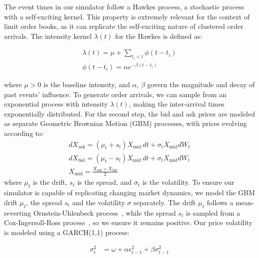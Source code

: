 \documentclass[11pt]{article}
\begin{document}
    The event times in our simulator follow a Hawkes process,
    a stochastic process with a self-exciting kernel.
    This property is extremely relevant for the context of limit order books,
    as it can replicate the self-exciting nature of clustered order arrivals.
    The intensity kernel \( \lambda(t) \) for the Hawkes is defined as:

    \begin{equation}
        \begin{aligned}
            \lambda(t) = \mu + \sum_{t_i < t} \phi(t - t_i)\\
            \phi(t - t_i) = \alpha e^{-\beta(t - t_i)}
        \end{aligned}
        \label{eq:hawkes}
    \end{equation}

    where \( \mu > 0 \) is the baseline intensity, and \( \alpha \), \( \beta \) govern the magnitude and decay of past events' influence.
    To generate order arrivals, we can sample from an exponential process with intensity \( \lambda(t) \),
    making the inter-arrival times exponentially distributed.
    For the second step, the bid and ask prices are modeled as separate Geometric Brownian Motion (GBM) processes, 
    with prices evolving according to:
    \begin{gather}
        dX_{\text{ask}} = (\mu_t + s_t) X_{\text{mid}} \, dt + \sigma_t X_{\text{mid}} dW_t\\
        dX_{\text{bid}} = (\mu_t - s_t) X_{\text{mid}} \, dt + \sigma_t X_{\text{mid}} dW_t\\
        X_{\text{mid}} = \frac{X_{\text{ask}} + X_{\text{bid}}}{2}
        \label{eq:gbm}
    \end{gather}
    where \( \mu_t \) is the drift, \( s_t \) is the spread, and \(  \sigma_t \) is the volatility.
    To ensure our simulator is capable of replicating changing market dynamics,
    we model the GBM drift $\mu_t$, the spread $s_t$ and the volatility $\sigma$ separately.
    The drift \( \mu_t \) follows a mean-reverting Ornstein-Uhlenbeck process~\citep{Uhlenbeck1930},
    while the spread \( s_t \) is sampled from a Cox-Ingersoll-Ross process~\citep{Cox1985}, so we ensure it remains positive.
    Our price volatility is modeled using a GARCH(1,1) process:

    \begin{equation}
        \begin{aligned} 
            \sigma_t^2 &= \omega + \alpha \epsilon_{t-1}^2 + \beta \sigma_{t-1}^2
        \end{aligned}
    \end{equation}
\end{document}
